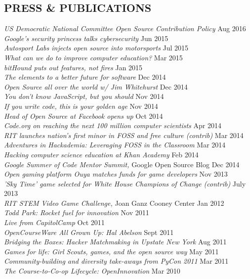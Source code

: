 \documentclass[margin]{res}
\begin{document}
\begin{resume}
\section{PRESS \& PUBLICATIONS} 
    {\it US Democratic National Committee Open Source Contribution Policy}  \hfill Aug 2016\\
    {\it Google's security princess talks cybersecurity}  \hfill Jun 2015\\
    {\it Autosport Labs injects open source into motorsports}  \hfill Jul 2015\\
    {\it What can we do to improve computer education?}  \hfill Mar 2015\\
    {\it bitHound puts out features, not fires}  \hfill Jan 2015\\
    {\it The elements to a better future for software}  \hfill Dec 2014\\
    {\it Open Source all over the world w/ Jim Whitehurst}  \hfill Dec 2014\\
    {\it You don't know JavaScript, but you should}  \hfill Nov 2014\\
    {\it If you write code, this is your golden age}  \hfill Nov 2014\\
    {\it Head of Open Source at Facebook opens up}  \hfill Oct 2014\\
    {\it Code.org on reaching the next 100 million computer scientists}  \hfill Apr 2014\\
    {\it RIT launches nation’s first minor in FOSS and free culture (contrib)}  \hfill Mar 2014\\
    {\it Adventures in Hackademia: Leveraging FOSS in the Classroom}  \hfill Mar 2014\\
    {\it Hacking computer science education at Khan Academy}  \hfill Feb 2014\\
    {\it Google Summer of Code Mentor Summit,} Google Open Source Blog \hfill Dec 2014\\
    {\it Open gaming platform Ouya matches funds for game developers}  \hfill Nov 2013\\
    {\it 'Sky Time' game selected for White House Champions of Change (contrib)}  \hfill July 2013\\
    {\it RIT STEM Video Game Challenge,} Joan Ganz Cooney Center \hfill Jan 2012\\
    {\it Todd Park: Rocket fuel for innovation}  \hfill Nov 2011\\
    {\it Live from CapitolCamp}  \hfill Oct 2011\\
    {\it OpenCourseWare All Grown Up: Hal Abelson}  \hfill Sept 2011\\
    {\it Bridging the Boxes: Hacker Matchmaking in Upstate New York}  \hfill Aug 2011\\
    {\it Games for life: Girl Scouts, games, and the open source way}  \hfill May 2011\\
    {\it Community-building and diversity take-aways from PyCon 2011}  \hfill Mar 2011\\
    {\it The Course-to-Co-op Lifecycle: OpenInnovation\@RIT}  \hfill Mar 2010\\


\end{resume}
\end{document}
